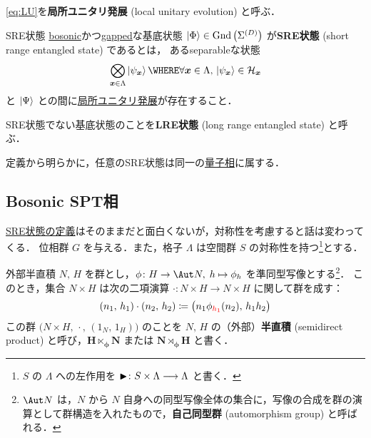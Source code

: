 \documentclass[TQFT_main]{subfiles}
\begin{document}
\eqref{eq:LU}を\textbf{局所ユニタリ発展} (local unitary evolution) と呼ぶ．

\begin{mydef}[label=def:SRE]{SRE状態}
    \hyperref[def:bosonic-lattice-model]{bosonic}かつ\hyperref[def:gapped]{gapped}な基底状態 $\ket{\Phi} \in \mathrm{Gnd}\left(\Sigma^{(D)}\right)$ が\textbf{SRE状態} (short range entangled state) であるとは，
    あるseparableな状態
    \begin{align}
        \bigotimes_{\bm{x} \in \Lambda} \ket{\psi_{\bm{x}}} \WHERE \forall \bm{x} \in \Lambda,\, \ket{\psi_{\bm{x}}} \in \mathcal{H}_{\bm{x}}
    \end{align}
    と $\ket{\Psi}$ との間に\hyperref[prop:LU]{局所ユニタリ発展}が存在すること．
    
    \tcblower

    SRE状態でない基底状態のことを\textbf{LRE状態} (long range entangled state) と呼ぶ．
\end{mydef}

定義から明らかに，任意のSRE状態は同一の\hyperref[def:quantum-phase]{量子相}に属する．

\subsection{Bosonic SPT相}

\hyperref[def:SRE]{SRE状態の定義}はそのままだと面白くないが，対称性を考慮すると話は変わってくる．
位相群 $G$ を与える．また，格子 $\Lambda$ は空間群 $S$ の対称性を持つ\footnote{$S$ の $\Lambda$ への左作用を $\blacktriangleright \colon S \times \Lambda \longrightarrow \Lambda$ と書く．}とする．

\begin{mydef}[label=def:semiprod-group-inner]{外部半直積}
	$N,\, H$ を群とし，$\phi \colon H \to \Aut N,\; h \mapsto \phi_h$ を準同型写像とする\footnote{$\Aut N$ は，$N$ から $N$ 自身への同型写像全体の集合に，写像の合成を群の演算として群構造を入れたもので，\textbf{自己同型群} (automorphism group) と呼ばれる．}．
	このとき，集合 $N \times H$ は次の二項演算 $\cdot \mathrel{} \colon N\times H \to N\times H$ に関して群を成す：
	\begin{align}
		(n_1,\, h_1) \cdot (n_2,\, h_2) \coloneqq \bigl( n_1 \phi_{\textcolor{red}{h_1}}(n_2),\, h_1h_2 \bigr) 
	\end{align}
	この群 $\bigl( N \times H,\, \cdot \mathrel{},\, (1_N,\, 1_H) \bigr)$ のことを $N,\, H$ の（外部）\textbf{半直積} (semidirect product) と呼び，$\bm{H \ltimes_\phi N}$ または $\bm{N \rtimes_\phi H}$ と書く．
\end{mydef}
\end{document}

